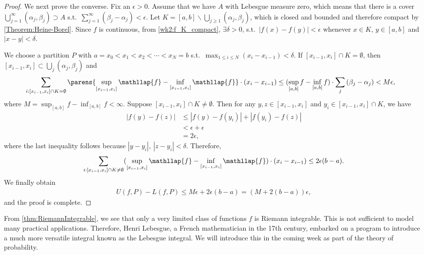 \documentclass[../aipt.tex]{subfiles}
\begin{document}
\begin{proof}
We next prove the converse. Fix an $\epsilon>0$. Assume that we have $A$ with Lebesgue measure zero, which means that there is a cover $\bigcup_{j=1}^{\infty}{(\alpha_j,\beta_j)} \supset A$ s.t.\ $\sum_{j=1}^{\infty}(\beta_j-\alpha_j)<\epsilon$.  Let $K=[a,b]\backslash\bigcup_{j\geq 1}{(\alpha_j,\beta_j)}$, which is closed and bounded and therefore compact by \cref{Theorem:Heine-Borel}. Since $f$ is continuous, from \cref{wk2:f_K_compact}, $\exists \delta>0$, s.t.\ $|f(x)-f(y)|<\epsilon$ whenever $x \in K$, $y\in[a,b]$ and $|x-y|<\delta$. 

We choose a partition $P$ with $a=x_0<x_1<x_2<\cdots<x_N=b$ s.t.\ $\max_{1\leq i \leq N}(x_i-x_{i-1})<\delta$. If $[x_{i-1},x_i]\cap K=\emptyset$, then $[x_{i-1},x_i]\subset \bigcup_{j}{(\alpha_j,\beta_j)}$ and
\begin{align*}
\sum_{i:[x_{i-1},x_i]\cap K=\emptyset}{\parens{\sup_{[x_{i-1},x_i]}\mathllap{f}-\inf_{[x_{i-1},x_i]}\mathllap{f}}\cdot(x_i-x_{i-1})}&\leq (\sup_{[a,b]}{f}-\inf_{[a,b]}{f})\cdot \sum_{j}{(\beta_j-\alpha_j)} < M\epsilon,
\end{align*}
where $M=\sup_{[a,b]}{f}-\inf_{[a,b]}{f} < \infty$. Suppose $[x_{i-1},x_i]\cap K\ne\emptyset$. Then for any $y, z \in [x_{i-1},x_i]$ and $y_i\in [x_{i-1},x_i]\cap K$, we have 
\begin{align*}
|f(y)-f(z)|&\leq|f(y)-f(y_i)|+|f(y_i)-f(z)|\\
&<\epsilon+\epsilon\\
&=2\epsilon,
\end{align*}
where the last inequality follows because $|y-y_i|,\ |z-y_i| < \delta$. Therefore,
\begin{align*}
\sum_{i: [x_{i-1},x_i]\cap K\ne\emptyset} (\sup_{[x_{i-1},x_i]}\mathllap{f}-\inf_{[x_{i-1},x_i]}\mathllap{f})\cdot(x_i-x_{i-1}) \leq 2\epsilon (b-a).
\end{align*}
We finally obtain
\begin{align*}
U(f,P)-L(f,P)\leq M\epsilon + 2\epsilon(b-a)= (M+2(b-a))\epsilon, 
\end{align*}
and the proof is complete.
\end{proof}

From \cref{thm:RiemannIntegrable}, we see that only a very limited class of functions $f$ is Riemann integrable. This is not sufficient to model many practical applications. Therefore, Henri Lebesgue, a French mathematician in the 17th century, embarked on a program to introduce a much more versatile integral known as the Lebesgue integral. We will introduce this in the coming week as part of the theory of probability. 

%
%
\end{document}
